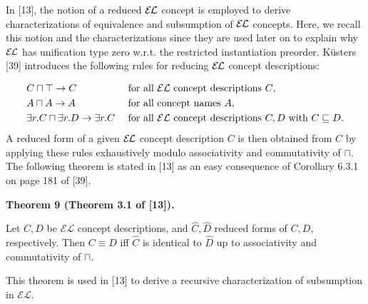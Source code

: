\documentclass[10pt,a4paper]{amsart}
\begin{document}
In [13], the notion of a reduced $\mathcal{E\mkern-1.618muL}$ concept is employed to derive characterizations of equivalence and subsumption of $\mathcal{E\mkern-1.618muL}$ concepts. Here, we recall this notion and the characterizations since they are used later on to explain why $\mathcal{E\mkern-1.618muL}$ has unification type zero w.r.t. the restricted instantiation preorder. Küsters [39] introduces the following rules for reducing $\mathcal{E\mkern-1.618muL}$ concept descriptions:\par
    \[\begin{array}[]{l@{\ \ \ \ }l}C\sqcap\top\rightarrow C&\mbox{for all $\mathcal%
{EL}$ concept descriptions $C$},\\[3.00003pt]
A\sqcap A\rightarrow A&\mbox{for all concept names $A$},\\[3.00003pt]
\exists r.C\sqcap\exists r.D\rightarrow\exists r.C&\mbox{for all $\mathcal{EL}%
$ concept descriptions $C,D$
with $C\sqsubseteq D$}.\end{array}\]    
A reduced form of a given $\mathcal{E\mkern-1.618muL}$ concept description $C$ is then obtained from $C$ by applying these rules exhaustively modulo associativity and commutativity of $\sqcap$. The following theorem is stated in [13] as an easy consequence of Corollary 6.3.1 on page 181 of [39].\par
 
 
 
\par\medskip\noindent\textbf{Theorem 9 (Theorem 3.1 of [13]).}\par
 
 
Let $C,D$ be $\mathcal{EL}$ concept descriptions, and $\widehat{C},\widehat{D}$ reduced forms of $C,D$, respectively. Then $C\equiv D$ iff $\widehat{C}$ is identical to $\widehat{D}$ up to associativity and commutativity of $\sqcap$.\par
 
 
 
 
This theorem is used in [13] to derive a recursive characterization of subsumption in $\mathcal{EL}$.\par
 
 
 
\end{document}
